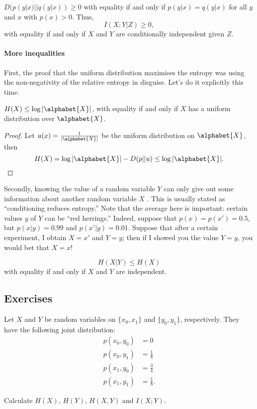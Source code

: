 \documentclass[a4paper, 11pt, openany]{book}
\begin{document}
\begin{corollary}
$D(p(y|x) || q(y|x)) \ge 0$ with equality if and only if $p(y|x) = q(y|x)$ for all $y$ and $x$ with $p(x) > 0$. Thus,
\[
	I(X;Y|Z) \ge 0,
\]
with equality if and only if $X$ and $Y$ are conditionally independent given $Z$.
\end{corollary}



\paragraph{More inequalities}
First, the proof that the uniform distribution maximises the entropy was using the non-negativity of the relative entropy in disguise. Let's do it explicitly this time.

\begin{theorem}
$H(X) \le \log |\alphabet{X}|$, with equality if and only if $X$ has a uniform distribution over $\alphabet{X}$.
\end{theorem}

\begin{proof}
Let $u(x) = \frac{1}{|\alphabet{X}|}$ be the uniform distribution on $\alphabet{X}$, then
$$
	H(X) = \log |\alphabet{X}| - D(p||u) \le \log |\alphabet{X}|.
$$
\end{proof}

Secondly, knowing the value of a random variable $Y$ can only give out some information about another random variable $X$ . This is usually stated as ``conditioning reduces entropy.'' Note that the average here is important: certain values $y$ of $Y$ can be ``red herrings.'' Indeed, suppose that $p(x) = p(x') = 0.5$, but $p(x|y) = 0.99$ and $p(x'|y) = 0.01$. Suppose that after a certain experiment, I obtain $X = x'$ and $Y= y$; then if I showed you the value $Y = y$, you would bet that $X = x$!

\begin{theorem}
$$
	H(X|Y) \le H(X)
$$
with equality if and only if $X$ and $Y$ are independent.
\end{theorem}





\subsection{Exercises}


\begin{exercise}
Let $X$ and $Y$ be random variables on $\{x_0,x_1\}$ and $\{y_0,y_1\}$, respectively. They have the following joint distribution:
\begin{align*}
	p(x_0,y_0) &= 0\\
	p(x_0,y_1) &= \frac{1}{8}\\
	p(x_1,y_0) &= \frac{3}{4}\\
	p(x_1,y_1) &= \frac{1}{8}.
\end{align*}

Calculate $H(X)$, $H(Y)$, $H(X,Y)$ and $I(X;Y)$.
\end{exercise}
\end{document}
